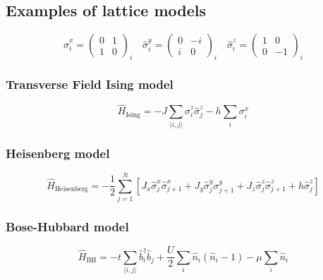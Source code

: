 \subsection{Examples of lattice models}
\label{subsec:latt-examples}

\begin{equation}
	\hat{\sigma}^x_{i}=\left(\begin{array}{cc}0 & 1 \\ 1 & 0\end{array}\right)_{i} \quad \hat{\sigma}^y_{i}=\left(\begin{array}{cc}0 & -i \\ i & 0\end{array}\right)_{i} \quad \hat{\sigma}^z_{i}=\left(\begin{array}{cc}1 & 0 \\ 0 & -1\end{array}\right)_{i}
\end{equation}


\subsubsection{Transverse Field Ising model}
\begin{equation}
	\hat H_{\mathrm{Ising}}=-J \sum_{\langle i, j\rangle} \hat{\sigma}^z_{i} \hat{\sigma}^z_{j}-h \sum_{i} \sigma^x_{i}
\end{equation}

\subsubsection{Heisenberg model}
\begin{equation}
	\hat{H}_{\mathrm{Heisenberg}}=-\frac{1}{2} \sum_{j=1}^{N}
	\left[J_{x} \hat{\sigma}_{j}^{x} \hat{\sigma}_{j+1}^{x}+J_{y} \hat{\sigma}_{j}^{y} \sigma_{j+1}^{y}+J_{z} \hat{\sigma}_{j}^{z} \hat{\sigma}_{j+1}^{z}+h \hat{\sigma}_{j}^{z}
	\right]
\end{equation}

\subsubsection{Bose-Hubbard model}
\begin{equation}
	\hat{H}_{\mathrm{BH}}= -t \sum_{\langle i, j\rangle} \hat{b}_{i}^{\dagger} \hat{b}_{j}+\frac{U}{2} \sum_{i} \hat{n}_{i}\left(\hat{n}_{i}-1\right)-\mu \sum_{i} \hat{n}_{i}
\end{equation}


